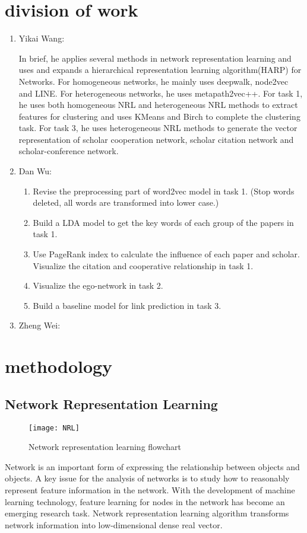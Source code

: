 \documentclass[conference]{IEEEtran}
\begin{document}
\section{division of work}
\begin{enumerate}
\item Yikai Wang: 

In brief, he applies several methods in network representation learning and uses and expands a hierarchical representation learning algorithm(HARP) for Networks. For homogeneous networks, he mainly uses deepwalk, node2vec and LINE. For heterogeneous networks, he uses metapath2vec++. For task 1, he uses both homogeneous NRL and heterogeneous NRL methods to extract features for clustering and uses KMeans and Birch to complete the clustering task. For task 3, he uses heterogeneous NRL methods to generate the vector representation of scholar cooperation network, scholar citation network and scholar-conference network.
\item Dan Wu:
\begin{enumerate}
\item Revise the preprocessing part of word2vec model in task 1. (Stop words deleted, all words are transformed into lower case.)
\item Build a LDA model to get the key words of each group of the papers in task 1.
\item Use PageRank index to calculate the influence of each paper and scholar. Visualize  the citation and cooperative relationship in task 1.
\item Visualize the ego-network in task 2.
\item Build a baseline model for link prediction in task 3.
\end{enumerate}
\item Zheng Wei:
\end{enumerate}
\section{methodology}
\subsection{Network Representation Learning}
\begin{figure}[h]
\centering
\texttt{[image: NRL]}
\caption{Network representation learning flowchart}
\label{fig_NRL}
\end{figure}
Network is an important form of expressing the relationship between objects and objects. A key issue for the analysis of networks is to study how to reasonably represent feature information in the network. With the development of machine learning technology, feature learning for nodes in the network has become an emerging research task. Network representation learning algorithm transforms network information into low-dimensional dense real vector. 
\end{document}
